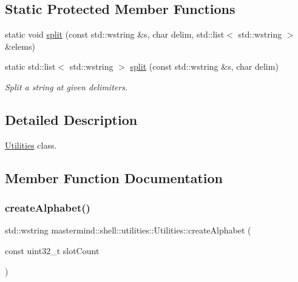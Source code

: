 \subsection*{Static Protected Member Functions}
\begin{DoxyCompactItemize}
\item 
static void \hyperlink{classmastermind_1_1shell_1_1utilities_1_1_utilities_a9676baba3bcb2d508ccedce50f466a9c}{split} (const std\+::wstring \&s, char delim, std\+::list$<$ std\+::wstring $>$ \&elems)
\item 
static std\+::list$<$ std\+::wstring $>$ \hyperlink{classmastermind_1_1shell_1_1utilities_1_1_utilities_ac053c782cd5669535205daf989e0f695}{split} (const std\+::wstring \&s, char delim)
\begin{DoxyCompactList}\small\item\em Split a string at given delimiters. \end{DoxyCompactList}\end{DoxyCompactItemize}


\subsection{Detailed Description}
\hyperlink{classmastermind_1_1shell_1_1utilities_1_1_utilities}{Utilities} class. 

\subsection{Member Function Documentation}
\hypertarget{classmastermind_1_1shell_1_1utilities_1_1_utilities_a29b0701b6eeea2cc5557da28def33d3e}{}\label{classmastermind_1_1shell_1_1utilities_1_1_utilities_a29b0701b6eeea2cc5557da28def33d3e} 
\subsubsection{\texorpdfstring{create\+Alphabet()}{createAlphabet()}}
{\footnotesize\ttfamily std\+::wstring mastermind\+::shell\+::utilities\+::\+Utilities\+::create\+Alphabet (\begin{DoxyParamCaption}\item[{const uint32\+\_\+t}]{slot\+Count }\end{DoxyParamCaption})\hspace{0.3cm}{\ttfamily [static]}}



